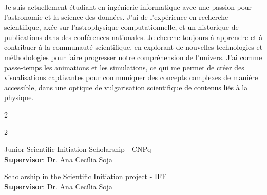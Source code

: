 \begin{fullwidth}
  


Je suis actuellement étudiant en ingénierie informatique avec une passion pour l'astronomie et la science des données. J'ai de l'expérience en recherche scientifique, axée sur l'astrophysique computationnelle, et un historique de publications dans des conférences nationales. Je cherche toujours à apprendre et à contribuer à la communauté scientifique, en explorant de nouvelles technologies et méthodologies pour faire progresser notre compréhension de l'univers. J'ai comme passe-temps les animations et les simulations, ce qui me permet de créer des visualisations captivantes pour communiquer des concepts complexes de manière accessible, dans une optique de vulgarisation scientifique de contenus liés à la physique.

\medskip


\begin{multicols}{2}

\columnbreak

\end{multicols}

\smallskip


\begin{multicols}{2}

Junior Scientific Initiation Scholarship - CNPq \\
\textbf{Supervisor}: Dr. Ana Cecília Soja

\divider

Scholarship in the Scientific Initiation project - IFF \\
\textbf{Supervisor}: Dr. Ana Cecília Soja


\end{multicols}
\end{fullwidth}
